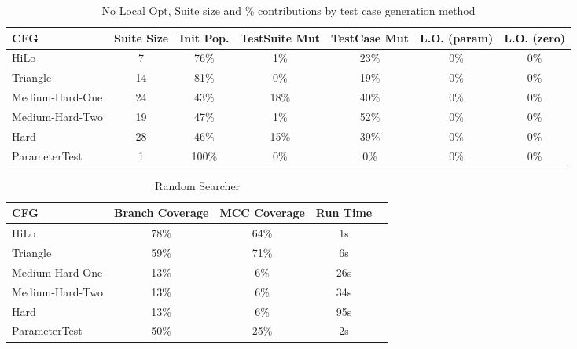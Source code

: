 \documentclass[runningheads]{llncs}
\begin{document}
\begin{table}[h!]
	\begin{center}
		\begin{tabular}{| l | c || c | c | c | c | c |}
			\hline
			CFG             & Suite Size & Init Pop. & TestSuite Mut & TestCase Mut & L.O. (param) & L.O. (zero) \\ \hline
			HiLo            & 7          & 76\%      & 1\%           & 23\%         & 0\%          & 0\%         \\ \hline
			Triangle        & 14         & 81\%      & 0\%           & 19\%         & 0\%          & 0\%         \\ \hline
			Medium-Hard-One & 24         & 43\%      & 18\%          & 40\%         & 0\%          & 0\%         \\ \hline
			Medium-Hard-Two & 19         & 47\%      & 1\%           & 52\%         & 0\%          & 0\%         \\ \hline
			Hard            & 28         & 46\%      & 15\%          & 39\%         & 0\%          & 0\%         \\ \hline
			ParameterTest   & 1          & 100\%     & 0\%           & 0\%          & 0\%          & 0\%         \\ \hline
		\end{tabular}
	\end{center}
	\caption{No Local Opt, Suite size and \% contributions by test case generation method}
	\label{tab:ContribNoLO}
\end{table}




\begin{table}[h!]
\begin{center}
	\begin{tabular}{| l | c | c | c | c |}
		\hline
		CFG             & Branch Coverage & MCC Coverage & Run Time   \\ \hline
		HiLo            & 78\%            & 64\%         & 1s         \\ \hline
		Triangle        & 59\%            & 71\%         & 6s         \\ \hline
		Medium-Hard-One & 13\%            & 6\%          & 26s        \\ \hline
		Medium-Hard-Two & 13\%            & 6\%          & 34s        \\ \hline
		Hard            & 13\%            & 6\%          & 95s        \\ \hline
		ParameterTest	& 50\% 			  & 25\% 		 & 2s 		  \\ \hline
	\end{tabular}
\end{center}

\caption{Random Searcher \label{tab:randSrch}}
\end{table}
\end{document}
